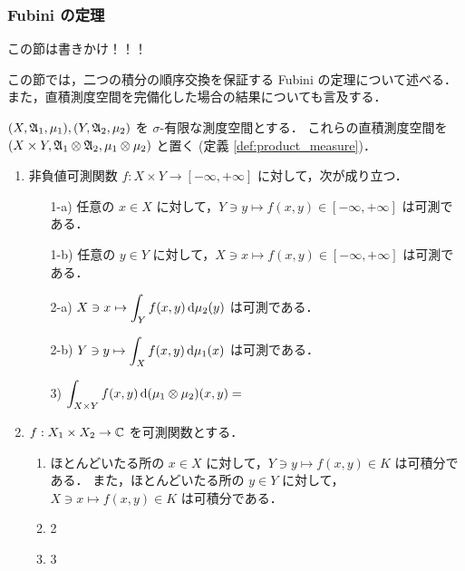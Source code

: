 \subsubsection{Fubini の定理}

{\color{red}この節は書きかけ！！！}

この節では，二つの積分の順序交換を保証する Fubini の定理について述べる．
また，直積測度空間を完備化した場合の結果についても言及する．

\begin{theorem}[Fubini]
    $(X,\mathfrak{A}_1,\mu_1),(Y,\mathfrak{A}_2,\mu_2)$ を $\sigma$-有限な測度空間とする．
    これらの直積測度空間を $(X\times Y,\mathfrak{A}_1\otimes\mathfrak{A}_2,\mu_1\otimes\mu_2)$ と置く (定義 \ref{def:product_measure})．
    \begin{enumerate}
        \item 非負値可測関数 $f:X\times Y\to[-\infty,+\infty]$ に対して，次が成り立つ．
            \begin{enumerate}
                \item[1-a)] 任意の $x\in X$ に対して，$Y\ni y\mapsto f(x,y)\in[-\infty,+\infty]$ は可測である．
                \item[1-b)] 任意の $y\in Y$ に対して，$X\ni x\mapsto f(x,y)\in[-\infty,+\infty]$ は可測である．
                \item[2-a)] $\displaystyle X\ni x\mapsto\int_Yf(x,y)\,\mathrm{d}\mu_2(y)$ は可測である．
                \item[2-b)] $\displaystyle Y\ni y\mapsto\int_Xf(x,y)\,\mathrm{d}\mu_1(x)$ は可測である．
                \item[3)]
                    $\displaystyle
                        \int_{X\times Y}f(x,y)\,\mathrm{d}(\mu_1\otimes\mu_2)(x,y)
                        =
                    $
            \end{enumerate}
        \item
            $f:X_1\times X_2\to\mathbb{C}$ を可測関数とする．
            \begin{enumerate}
                \item
                    ほとんどいたる所の $x\in X$ に対して，$Y\ni y\mapsto f(x,y)\in K$ は可積分である．
                    また，ほとんどいたる所の $y\in Y$ に対して，$X\ni x\mapsto f(x,y)\in K$ は可積分である．
                \item 2
                \item 3
            \end{enumerate}
    \end{enumerate}
\end{theorem}
